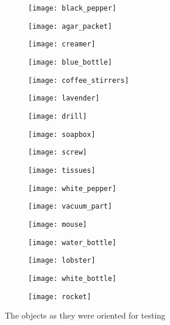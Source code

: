 \documentclass[letterpaper, 10 pt, conference]{ieeeconf}
\begin{document}
\begin{figure}[h]
\begin{subfigure}{0.24\columnwidth}
    \texttt{[image: black\_pepper]}
    \newline
    
    \texttt{[image: agar\_packet]}
\end{subfigure}
\begin{subfigure}{0.24\columnwidth}
     \texttt{[image: creamer]}
\end{subfigure}
\begin{subfigure}{0.24\columnwidth}
    \texttt{[image: blue\_bottle]}
\end{subfigure}
\begin{subfigure}{0.24\columnwidth}
    \texttt{[image: coffee\_stirrers]}
\end{subfigure}

\begin{subfigure}{0.24\columnwidth}
    \texttt{[image: lavender]}
\end{subfigure}
\begin{subfigure}{0.24\columnwidth}
    \texttt{[image: drill]}
    \newline
    
    \texttt{[image: soapbox]}
\end{subfigure}
\begin{subfigure}{0.24\columnwidth}
    \texttt{[image: screw]}
\end{subfigure}
\begin{subfigure}{0.24\columnwidth}
    \texttt{[image: tissues]}
    \newline
    
    \texttt{[image: white\_pepper]}
\end{subfigure}

\begin{subfigure}{0.24\columnwidth}
    \texttt{[image: vacuum\_part]}
    \newline
    
    \texttt{[image: mouse]}
\end{subfigure}
\begin{subfigure}{0.24\columnwidth}
    \texttt{[image: water\_bottle]}
\end{subfigure}
\begin{subfigure}{0.24\columnwidth}
    \texttt{[image: lobster]}
    \newline
    
    \texttt{[image: white\_bottle]}
\end{subfigure}
\begin{subfigure}{0.24\columnwidth}
    \texttt{[image: rocket]}
\end{subfigure}
\caption{The objects as they were oriented for testing}
\label{img:objects_orientations}
\end{figure}
\end{document}

